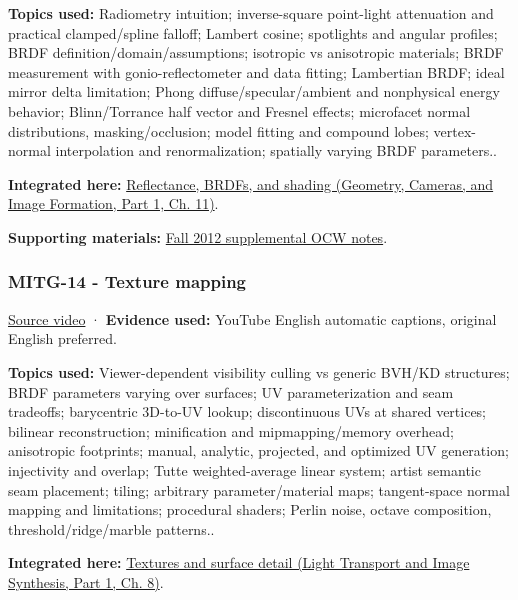 \textbf{Topics used:} Radiometry intuition; inverse-square point-light attenuation and practical clamped/spline falloff; Lambert cosine; spotlights and angular profiles; BRDF definition/domain/assumptions; isotropic vs anisotropic materials; BRDF measurement with gonio-reflectometer and data fitting; Lambertian BRDF; ideal mirror delta limitation; Phong diffuse/specular/ambient and nonphysical energy behavior; Blinn/Torrance half vector and Fresnel effects; microfacet normal distributions, masking/occlusion; model fitting and compound lobes; vertex-normal interpolation and renormalization; spatially varying BRDF parameters..

\textbf{Integrated here:} \href{../03-Geometry-Cameras-and-Image-Formation-P01/main.pdf\#nameddest=03-visual-computing-i-ch004-reflectance-brdfs-and-shading}{Reflectance, BRDFs, and shading (Geometry, Cameras, and Image Formation, Part 1, Ch. 11)}.

\textbf{Supporting materials:} \href{https://ocw.mit.edu/courses/6-837-computer-graphics-fall-2012/pages/lecture-notes/}{Fall 2012 supplemental OCW notes}.

\subsubsection{MITG-14 - Texture mapping}\label{04-visual-computing-ii-ch036-mitg-14---texture-mapping}

\hypertarget{04-visual-computing-ii-ch036-mitg-14---texture-mapping}{}

\href{https://www.youtube.com/watch?v=TQTciMjuxrY}{Source video} · \textbf{Evidence used:} YouTube English automatic captions, original English preferred.

\textbf{Topics used:} Viewer-dependent visibility culling vs generic BVH/KD structures; BRDF parameters varying over surfaces; UV parameterization and seam tradeoffs; barycentric 3D-to-UV lookup; discontinuous UVs at shared vertices; bilinear reconstruction; minification and mipmapping/memory overhead; anisotropic footprints; manual, analytic, projected, and optimized UV generation; injectivity and overlap; Tutte weighted-average linear system; artist semantic seam placement; tiling; arbitrary parameter/material maps; tangent-space normal mapping and limitations; procedural shaders; Perlin noise, octave composition, threshold/ridge/marble patterns..

\textbf{Integrated here:} \href{../04-Light-Transport-and-Image-Synthesis-P01/main.pdf\#nameddest=03-visual-computing-i-ch019-textures-and-surface-detail}{Textures and surface detail (Light Transport and Image Synthesis, Part 1, Ch. 8)}.

